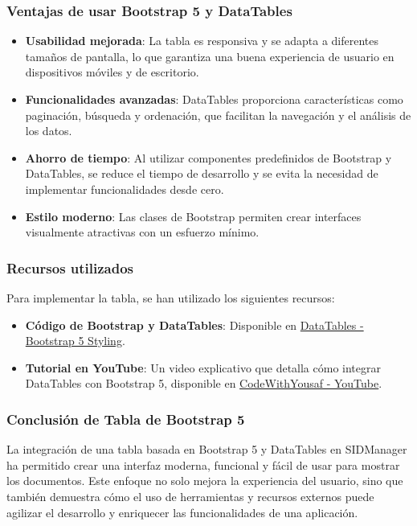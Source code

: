 \documentclass[draft]{scrbook}
\begin{document}
\subsubsection{Ventajas de usar Bootstrap 5 y DataTables}

\begin{itemize}
    \item \textbf{Usabilidad mejorada}: La tabla es responsiva y se adapta a diferentes tamaños de pantalla, lo que garantiza una buena experiencia de usuario en dispositivos móviles y de escritorio.
    \item \textbf{Funcionalidades avanzadas}: DataTables proporciona características como paginación, búsqueda y ordenación, que facilitan la navegación y el análisis de los datos.
    \item \textbf{Ahorro de tiempo}: Al utilizar componentes predefinidos de Bootstrap y DataTables, se reduce el tiempo de desarrollo y se evita la necesidad de implementar funcionalidades desde cero.
    \item \textbf{Estilo moderno}: Las clases de Bootstrap permiten crear interfaces visualmente atractivas con un esfuerzo mínimo.
\end{itemize}

\subsubsection{Recursos utilizados}

Para implementar la tabla, se han utilizado los siguientes recursos:
\begin{itemize}
    \item \textbf{Código de Bootstrap y DataTables}: Disponible en \href{https://datatables.net/examples/styling/bootstrap5}{DataTables - Bootstrap 5 Styling}.
    \item \textbf{Tutorial en YouTube}: Un video explicativo que detalla cómo integrar DataTables con Bootstrap 5, disponible en \href{https://www.youtube.com/watch?v=FMpA3bRqTHk&ab_channel=CodeWithYousaf}{CodeWithYousaf - YouTube}.
\end{itemize}

\subsubsection{Conclusión de Tabla de Bootstrap 5}

La integración de una tabla basada en Bootstrap 5 y DataTables en SIDManager ha permitido crear una interfaz moderna, funcional y fácil de usar para mostrar los documentos. Este enfoque no solo mejora la experiencia del usuario, sino que también demuestra cómo el uso de herramientas y recursos externos puede agilizar el desarrollo y enriquecer las funcionalidades de una aplicación.
\end{document}

